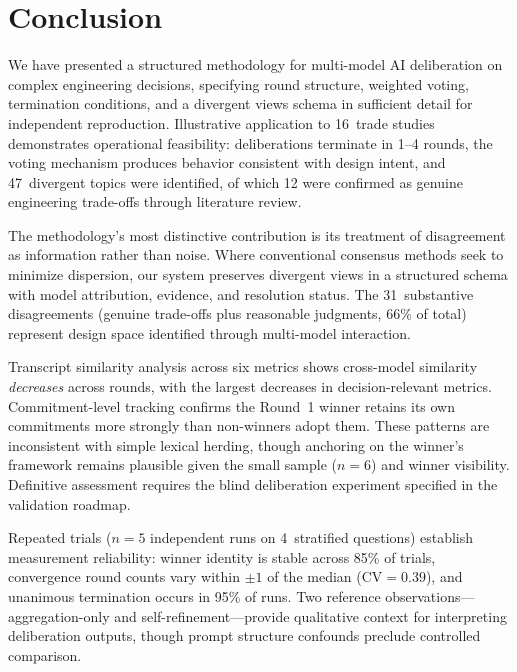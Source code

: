\documentclass[11pt,a4paper]{article}
\begin{document}
\section{Conclusion}
\label{sec:conclusion}

We have presented a structured methodology for multi-model AI deliberation on complex engineering decisions, specifying round structure, weighted voting, termination conditions, and a divergent views schema in sufficient detail for independent reproduction. Illustrative application to 16~trade studies demonstrates operational feasibility: deliberations terminate in 1--4 rounds, the voting mechanism produces behavior consistent with design intent, and 47~divergent topics were identified, of which 12 were confirmed as genuine engineering trade-offs through literature review.

The methodology's most distinctive contribution is its treatment of disagreement as information rather than noise. Where conventional consensus methods seek to minimize dispersion, our system preserves divergent views in a structured schema with model attribution, evidence, and resolution status. The 31~substantive disagreements (genuine trade-offs plus reasonable judgments, 66\% of total) represent design space identified through multi-model interaction.

Transcript similarity analysis across six metrics shows cross-model similarity \emph{decreases} across rounds, with the largest decreases in decision-relevant metrics. Commitment-level tracking confirms the Round~1 winner retains its own commitments more strongly than non-winners adopt them. These patterns are inconsistent with simple lexical herding, though anchoring on the winner's framework remains plausible given the small sample ($n = 6$) and winner visibility. Definitive assessment requires the blind deliberation experiment specified in the validation roadmap.

Repeated trials ($n = 5$ independent runs on 4~stratified questions) establish measurement reliability: winner identity is stable across 85\% of trials, convergence round counts vary within $\pm 1$ of the median ($\text{CV} = 0.39$), and unanimous termination occurs in 95\% of runs. Two reference observations---aggregation-only and self-refinement---provide qualitative context for interpreting deliberation outputs, though prompt structure confounds preclude controlled comparison.
\end{document}
